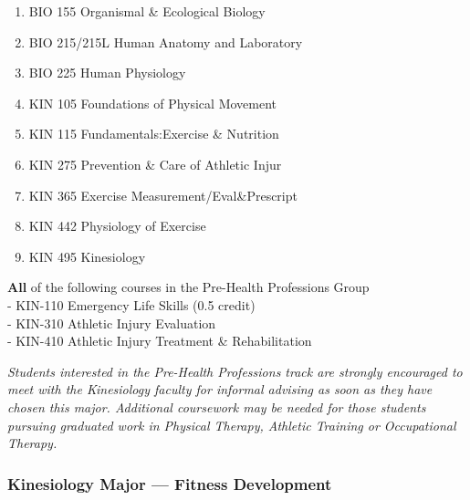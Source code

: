 \documentclass[
  letterpaper,
]{scrbook}
\providecommand{\tightlist}{%
  \setlength{\itemsep}{0pt}\setlength{\parskip}{0pt}}
\begin{document}
\begin{enumerate}
\def\labelenumi{\arabic{enumi}.}
\tightlist
\item
  BIO 155 Organismal \& Ecological Biology\\
\item
  BIO 215/215L Human Anatomy and Laboratory\\
\item
  BIO 225 Human Physiology\\
\item
  KIN 105 Foundations of Physical Movement\\
\item
  KIN 115 Fundamentals:Exercise \& Nutrition\\
\item
  KIN 275 Prevention \& Care of Athletic Injur\\
\item
  KIN 365 Exercise Measurement/Eval\&Prescript\\
\item
  KIN 442 Physiology of Exercise\\
\item
  KIN 495 Kinesiology
\end{enumerate}

\textbf{All} of the following courses in the Pre-Health Professions
Group\\
- KIN-110 Emergency Life Skills (0.5 credit)\\
- KIN-310 Athletic Injury Evaluation\\
- KIN-410 Athletic Injury Treatment \& Rehabilitation

\emph{Students interested in the Pre-Health Professions track are
strongly encouraged to meet with the Kinesiology faculty for informal
advising as soon as they have chosen this major. Additional coursework
may be needed for those students pursuing graduated work in Physical
Therapy, Athletic Training or Occupational Therapy.}

\subsubsection{Kinesiology Major --- Fitness
Development}\label{kinesiology-major-fitness-development}
\end{document}
